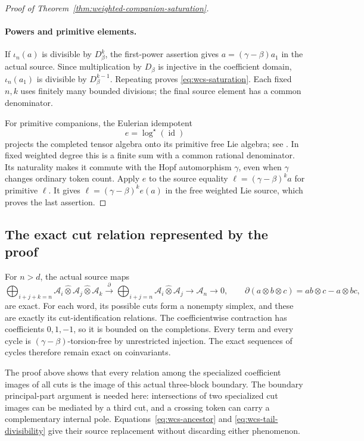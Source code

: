 \begin{proof}[Proof of Theorem~\ref{thm:weighted-companion-saturation}]
\paragraph{Powers and primitive elements.}
If \(\iota_n(a)\) is divisible by \(D_\beta^k\), the
first-power assertion gives \(a=(\gamma-\beta)a_1\)
in the actual source.  Since multiplication by
\(D_\beta\) is injective in the coefficient domain,
\(\iota_n(a_1)\) is divisible by \(D_\beta^{k-1}\).
Repeating proves \eqref{eq:wcs-saturation}.  Each fixed
\(n,k\) uses finitely many bounded divisions; the final
source element has a common denominator.

For primitive companions, the Eulerian idempotent
\[
 e=\log^\star(\operatorname{id})
 \]
projects the completed tensor algebra onto its primitive
free Lie algebra; see \cite[\S1.1, p.~2]{BandieraSchaetz}.
In fixed weighted degree this is a finite sum with a
common rational denominator.  Its naturality makes it
commute with the Hopf automorphism \(\gamma\), even when
\(\gamma\) changes ordinary token count.  Apply \(e\)
to the source equality
\(\ell=(\gamma-\beta)^k a\) for primitive \(\ell\).
It gives
\(\ell=(\gamma-\beta)^k e(a)\) in the free weighted
Lie source, which proves the last assertion.
\end{proof}

\subsection{The exact cut relation represented by the proof}

For \(n>d\), the actual source maps
\[
 \bigoplus_{i+j+k=n}\mathcal A_i\widehat\otimes
       \mathcal A_j\widehat\otimes\mathcal A_k
 \xrightarrow{\ \partial\ }
 \bigoplus_{i+j=n}\mathcal A_i\widehat\otimes\mathcal A_j
 \longrightarrow\mathcal A_n\longrightarrow0,
 \qquad
 \partial(a\otimes b\otimes c)=ab\otimes c-a\otimes bc,
\]
are exact.  For each word, its possible cuts form a
nonempty simplex, and these are exactly its cut-identification
relations.  The coefficientwise contraction has coefficients
\(0,1,-1\), so it is bounded on the completions.
Every term and every cycle is \((\gamma-\beta)\)-torsion-free
by unrestricted injection.  The exact sequences of cycles
therefore remain exact on coinvariants.

The proof above shows that every relation among the
specialized coefficient images of all cuts is the image
of this actual three-block boundary.  The boundary
principal-part argument is needed here: intersections
of two specialized cut images can be mediated by a
third cut, and a crossing token can carry a complementary
internal pole.  Equations~\eqref{eq:wcs-ancestor} and
\eqref{eq:wcs-tail-divisibility} give their source
replacement without discarding either phenomenon.
